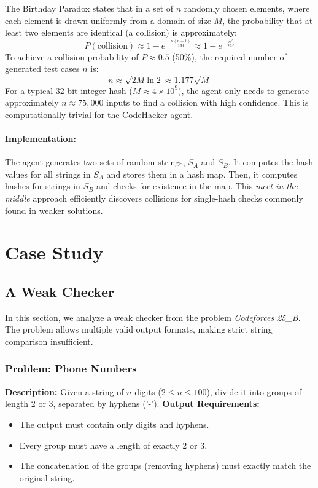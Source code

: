 \documentclass[11pt]{article}
\begin{document}
The Birthday Paradox states that in a set of $n$ randomly chosen elements, where each element is drawn uniformly from a domain of size $M$, the probability that at least two elements are identical (a collision) is approximately:
\[
P(\text{collision}) \approx 1 - e^{-\frac{n(n-1)}{2M}} \approx 1 - e^{-\frac{n^2}{2M}}
\]
To achieve a collision probability of $P \approx 0.5$ (50\%), the required number of generated test cases $n$ is:
\[
n \approx \sqrt{2M \ln 2} \approx 1.177 \sqrt{M}
\]
For a typical 32-bit integer hash ($M \approx 4 \times 10^9$), the agent only needs to generate approximately $n \approx 75,000$ inputs to find a collision with high confidence. This is computationally trivial for the CodeHacker agent. 

\paragraph{Implementation:}
The agent generates two sets of random strings, $S_A$ and $S_B$. It computes the hash values for all strings in $S_A$ and stores them in a hash map. Then, it computes hashes for strings in $S_B$ and checks for existence in the map. This \textit{meet-in-the-middle} approach efficiently discovers collisions for single-hash checks commonly found in weaker solutions.



\section{Case Study}

\subsection{A Weak Checker}
\label{appx:weak_checker}

In this section, we analyze a weak checker from the problem \textit{Codeforces 25\_B}. The problem allows multiple valid output formats, making strict string comparison insufficient.

\subsubsection{Problem: Phone Numbers}
\textbf{Description:} Given a string of $n$ digits ($2 \le n \le 100$), divide it into groups of length 2 or 3, separated by hyphens ('-').
\newline
\textbf{Output Requirements:}
\begin{itemize}
    \item The output must contain only digits and hyphens.
    \item Every group must have a length of exactly 2 or 3.
    \item The concatenation of the groups (removing hyphens) must exactly match the original string.
\end{itemize}
\end{document}
